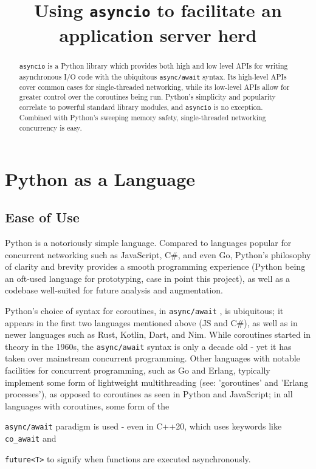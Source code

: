 \documentclass[letterpaper,twocolumn,10pt]{article}
\newcommand{\code}[1]{
    \texttt{#1}
}
\begin{document}
\date{}

\title{\Large \bf Using \code{asyncio} to facilitate an application server herd}

\maketitle


\begin{abstract}

    \code{asyncio} is a Python library which provides both high and low level APIs for writing
    asynchronous I/O code with the ubiquitous \code{async/await} syntax.  Its high-level APIs 
    cover common cases for single-threaded networking, while its low-level APIs allow for greater
    control over the coroutines being run.  Python's simplicity and popularity correlate
    to powerful standard library modules, and \code{asyncio} is no exception. Combined with
    Python's sweeping memory safety, single-threaded networking concurrency is easy.

\end{abstract}


\section{Python as a Language}

\subsection{Ease of Use}

Python is a notoriously simple language.  Compared to languages popular for concurrent networking such
as JavaScript, C\#, and even Go, Python's philosophy of clarity and brevity provides a smooth programming
experience (Python being an oft-used language for prototyping, case in point this project), as well as
a codebase well-suited for future analysis and augmentation.

Python's choice of syntax for coroutines, in \code{async/await}, is ubiquitous; it appears in the first
two languages mentioned above (JS and C\#), as well as in newer languages such as Rust, Kotlin, Dart,
and Nim.  While coroutines started in theory in the 1960s, the \code{async/await} syntax is only a
decade old - yet it has taken over mainstream concurrent programming.  Other languages with notable
facilities for concurrent programming, such as Go and Erlang, typically implement some form of
lightweight multithreading (see: 'goroutines' and 'Erlang processes'), as opposed to coroutines as 
seen in Python and JavaScript; in all languages with coroutines, some form of the 
\code{async/await} paradigm is used - even in C++20, which uses keywords like \code{co_await} and
\code{future<T>} to signify when functions are executed asynchronously.
\end{document}
